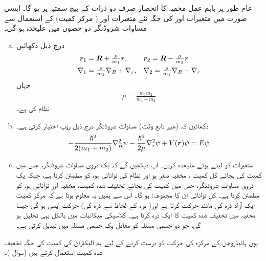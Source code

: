 عام طور پر باہم عمل مخفیہ کا انحصار صرف دو ذرات کے بیچ سمتیہ  پر ہو گا۔ ایسی صورت میں متغیرات  اور  کی جگہ نئے متغیرات  اور
( مرکز کمیت) کے استعمال سے مساوات شروڈنگر دو حصوں میں علیحدہ ہو گی۔ 
\begin{enumerate}[a.]
\item
درج ذیل دکھائیں
\begin{align*}
 {\ensuremath{{\boldsymbol{r}}}}_1 &= {{\boldsymbol{R}}} + \tfrac{ \mu}{m_1}{{\boldsymbol{r}}}, && {{\boldsymbol{r}}}_2 = {{\boldsymbol{R}}} - \tfrac{ \mu }{ m_2 } {{\boldsymbol{r}}}\\
 \nabla_1& = \tfrac{ \mu }{ m_2 }\nabla_R + \nabla_r , && \nabla_2 = \tfrac{ \mu }{ m_1 } \nabla_R - \nabla_r
\end{align*}
جہاں 
\begin{align}\label{مساوات_متماثل_تخفیف_شدہ_کمیت}
\mu = \frac{ m_1 m_2 }{ m_1 + m_2 }
\end{align}
نظام کی  ہے۔
\item 
 دکھائیں کہ (غیر تابع وقت) مساوات شروڈنگر درج ذیل روپ اختیار کرتی ہے۔
\begin{align*}
- \frac{ \hslash^2 }{ 2 ( m_1 + m_2 ) } \nabla_R^2 \psi - \frac{ \hslash^2 }{ 2 \mu }\nabla_r^2 { \psi } + V({{\boldsymbol{r}}}) \psi = E \psi
\end{align*}
\item
 متغیرات کو  لیتے ہوئے علیحدہ کریں۔ آپ دیکھیں گے کہ  یک ذروی مساوات شروڈنگر، جس میں کمیت  کی بجائے کل کمیت ، مخفیہ صفر ہو اور نظام کی توانائی  ہو، کو مطمئن کرتا ہے، جبکہ  یک ذروی مساوات شروڈنگر، جس میں کمیت  کی بجائے تخفیف شدہ کمیت، مخفیہ  اور توانائی  ہو، کو مطمئن کرتا ہے۔ کل توانائی ان کا مجموعہ:  ہو گا۔ اس سے ہمیں یہ معلوم ہوتا ہے کہ مرکز کمیت ایک آزاد ذرہ کی مانند حرکت کرتا ہے اور( ذرہ  کے لحاظ سے ذرہ  کی)  حرکت ایسی ہو گی جیسا مخفیہ  میں تخفیف شدہ کمیت کا ایک ذرہ کرتا ہے۔ کلاسیکی میکانیات میں بالکل یہی تحلیل ہو گی، جو دو جسمی مسئلہ کو معادل یک جسمی مسئلہ میں تبدیل کرتی ہے۔ 
\end{enumerate}
 یوں ہائیڈروجن کے مرکزہ کی حرکت کو درست کرنے کے لیے ہم الیکٹران کی کمیت کی جگہ تخفیف شدہ کمیت استعمال کرتے ہیں (سوال )۔ 
